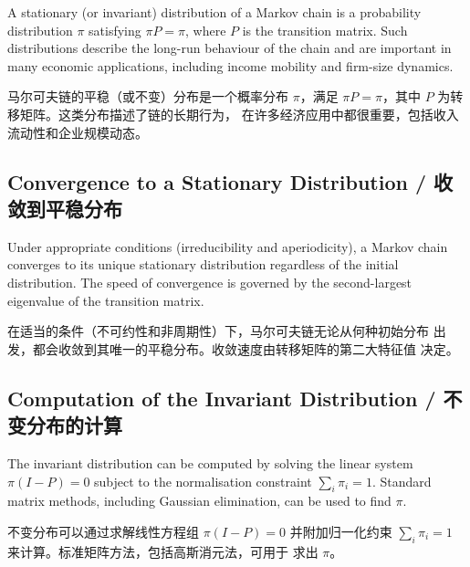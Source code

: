 \begin{original}
A stationary (or invariant) distribution of a Markov chain is a
probability distribution $\pi$ satisfying $\pi P = \pi$, where $P$ is
the transition matrix.  Such distributions describe the long-run
behaviour of the chain and are important in many economic applications,
including income mobility and firm-size dynamics.
\end{original}
\begin{translation}
马尔可夫链的平稳（或不变）分布是一个概率分布 $\pi$，满足
$\pi P = \pi$，其中 $P$ 为转移矩阵。这类分布描述了链的长期行为，
在许多经济应用中都很重要，包括收入流动性和企业规模动态。
\end{translation}

\subsection{Convergence to a Stationary Distribution / 收敛到平稳分布}

\begin{original}
Under appropriate conditions (irreducibility and aperiodicity), a
Markov chain converges to its unique stationary distribution regardless
of the initial distribution.  The speed of convergence is governed by
the second-largest eigenvalue of the transition matrix.
\end{original}
\begin{translation}
在适当的条件（不可约性和非周期性）下，马尔可夫链无论从何种初始分布
出发，都会收敛到其唯一的平稳分布。收敛速度由转移矩阵的第二大特征值
决定。
\end{translation}

\subsection{Computation of the Invariant Distribution / 不变分布的计算}

\begin{original}
The invariant distribution can be computed by solving the linear system
$\pi (I - P) = 0$ subject to the normalisation constraint
$\sum_i \pi_i = 1$.  Standard matrix methods, including Gaussian
elimination, can be used to find $\pi$.
\end{original}
\begin{translation}
不变分布可以通过求解线性方程组 $\pi (I - P) = 0$ 并附加归一化约束
$\sum_i \pi_i = 1$ 来计算。标准矩阵方法，包括高斯消元法，可用于
求出 $\pi$。
\end{translation}

